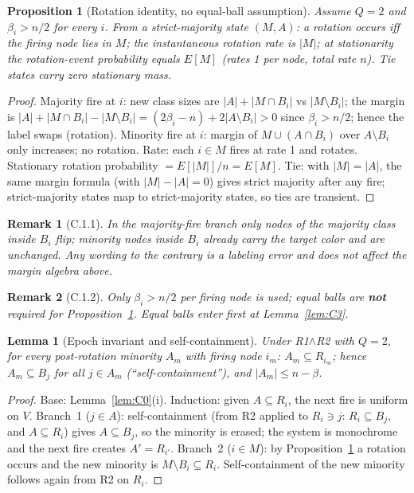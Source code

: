 \documentclass[preprint,12pt]{elsarticle}
\newtheorem{lemma}[theorem]{Lemma}
\newtheorem{proposition}[theorem]{Proposition}
\newtheorem{remark}{Remark}[theorem]
\begin{document}
\begin{proposition}[Rotation identity, no equal-ball assumption]
\label{prop:C1}
Assume $Q=2$ and $\beta_i>n/2$ for every $i$. From a strict-majority
state $(M,A)$: a rotation occurs iff the firing node lies in $M$; the
instantaneous rotation rate is $|M|$; at stationarity the rotation-event
probability equals $E[M]$ (rates 1 per node, total rate $n$). Tie states
carry zero stationary mass.
\end{proposition}
\begin{proof}
Majority fire at $i$: new class sizes are $|A|+|M\cap B_i|$ vs
$|M\setminus B_i|$; the margin is
$|A|+|M\cap B_i|-|M\setminus B_i|=(2\beta_i-n)+2|A\setminus B_i|>0$
since $\beta_i>n/2$; hence the label swaps (rotation). Minority fire at
$i$: margin of $M\cup(A\cap B_i)$ over $A\setminus B_i$ only increases;
no rotation. Rate: each $i\in M$ fires at rate 1 and rotates.
Stationary rotation probability $=E[|M|]/n=E[M]$. Tie: with $|M|=|A|$,
the same margin formula (with $|M|-|A|=0$) gives strict majority after
any fire; strict-majority states map to strict-majority states, so ties
are transient.
\end{proof}
\begin{remark}[C.1.1]
\label{rem:C1.1}
In the majority-fire branch only nodes of the \emph{majority} class
inside $B_i$ flip; minority nodes inside $B_i$ already carry the target
color and are unchanged. Any wording to the contrary is a labeling
error and does not affect the margin algebra above.
\end{remark}
\begin{remark}[C.1.2]
\label{rem:C1.2}
Only $\beta_i>n/2$ per firing node is used; equal balls are \textbf{not}
required for Proposition~\ref{prop:C1}. Equal balls enter first at
Lemma~\ref{lem:C3}.
\end{remark}

\begin{lemma}[Epoch invariant and self-containment]
\label{lem:C2}
Under R1$\wedge$R2 with $Q=2$, for every post-rotation minority $A_m$
with firing node $i_m$: $A_m\subseteq R_{i_m}$; hence $A_m\subseteq B_j$
for all $j\in A_m$ (``self-containment''), and
$|A_m|\le n-\beta$.
\end{lemma}
\begin{proof}
Base: Lemma~\ref{lem:C0}(i). Induction: given $A\subseteq R_i$, the next
fire is uniform on $V$. Branch~1 ($j\in A$): self-containment (from R2
applied to $R_i\ni j$: $R_i\subseteq B_j$, and $A\subseteq R_i$) gives
$A\subseteq B_j$, so the minority is erased; the system is monochrome
and the next fire creates $A'=R_{i'}$. Branch~2 ($i\in M$): by
Proposition~\ref{prop:C1} a rotation occurs and the new minority is
$M\setminus B_i\subseteq R_i$. Self-containment of the new minority
follows again from R2 on $R_i$.
\end{proof}
\end{document}
